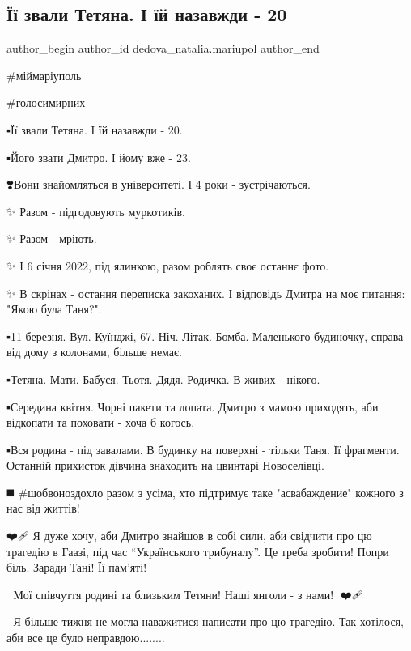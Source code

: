  
 
 
 
 

\subsection{Її звали Тетяна. І їй назавжди - 20}
\label{sec:27_01_2023.fb.dedova_natalia.mariupol.1.__zvali_tetyana____}

\ifcmt
 author_begin
   author_id dedova_natalia.mariupol
 author_end
\fi

\#міймаріуполь

\#голосимирних

▪️Її звали Тетяна. І їй назавжди - 20. 

▪️Його звати Дмитро. І йому вже - 23. 

❣️Вони знайомляться в університеті. І 4 роки - зустрічаються.  

✨ Разом - підгодовують муркотиків.

✨ Разом - мріють. 

✨ І 6 січня 2022, під ялинкою, разом роблять своє останнє фото. 

✨ В скрінах - остання переписка закоханих. І відповідь Дмитра на моє питання:
"Якою була Таня?". 

▪️11 березня. Вул. Куїнджі, 67. Ніч. Літак. Бомба. Маленького будиночку, справа
від дому з колонами, більше немає. 

▪️Тетяна. Мати. Бабуся. Тьотя. Дядя. Родичка. В живих - нікого. 

▪️Середина квітня. Чорні пакети та лопата. Дмитро з мамою приходять, аби
відкопати та поховати - хоча б когось. 

▪️Вся родина - під завалами. В будинку на поверхні - тільки Таня. Її фрагменти.
Останній прихисток дівчина знаходить на цвинтарі Новоселівці. 

◼️ \#шобвоноздохло разом з усіма, хто підтримує таке "асвабаждение" кожного з нас
від життів! 

❤️🩹 Я дуже хочу, аби Дмитро знайшов в собі сили, аби свідчити про цю
трагедію в Гаазі, під час \enquote{Українського трибуналу}. Це треба зробити! Попри
біль. Заради Тані! Її пам'яті! 

🥀 Мої співчуття родині та близьким Тетяни! Наші янголи - з нами! 🤍❤️🩹🤍

🥺 Я більше тижня не могла наважитися написати про цю трагедію. Так хотілося,
аби все це було неправдою........
